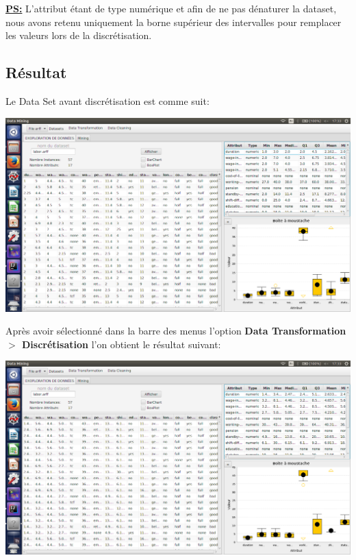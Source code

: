 \documentclass[12pt,a4paper,oneside]{book}
\begin{document}
	\underline{\textbf{PS:}} 
	L'attribut étant de type numérique et afin de ne pas dénaturer la dataset, nous avons retenu uniquement la borne supérieur des intervalles pour remplacer les valeurs lors de la discrétisation.
	
	\subsection{Résultat}
	Le Data Set avant discrétisation est comme suit: 
	\begin{center}
		\includegraphics[width=1\textwidth]{screens/avantDiscr.png}%
		\label{labelname}%
	\end{center}
	
	Après avoir sélectionné dans la barre des menus l'option \textbf{Data Transformation $>$ Discrétisation} l'on obtient le résultat suivant:
	
	\begin{center}
		\includegraphics[width=1\textwidth]{screens/apresDiscr.png}%
		\label{labelname}%
	\end{center}
	
\end{document}
